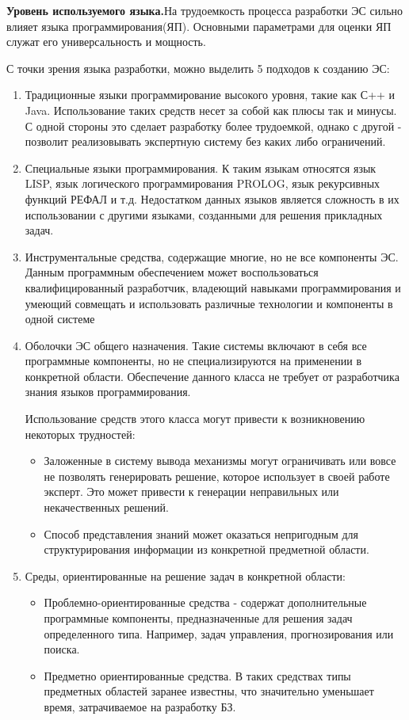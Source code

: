 \textbf{Уровень используемого языка.}На трудоемкость процесса разработки ЭС сильно влияет языка программирования(ЯП). Основными параметрами для оценки ЯП служат его универсальность и мощность.

С точки зрения языка разработки, можно выделить 5 подходов к созданию ЭС:

\begin{enumerate}
	\item Традиционные языки программирование высокого уровня, такие как С++ и Java. Использование таких средств несет за собой как плюсы так и минусы. С одной стороны это сделает разработку более трудоемкой, однако с другой - позволит реализовывать экспертную систему без каких либо ограничений.

	\item Специальные языки программирования. К таким языкам относятся язык LISP, язык логического программирования PROLOG, язык рекурсивных функций РЕФАЛ и т.д. Недостатком данных языков является сложность в их использовании с другими языками, созданными для решения прикладных задач.

	\item Инструментальные средства, содержащие многие, но не все компоненты ЭС. Данным программным обеспечением может воспользоваться квалифицированный разработчик, владеющий навыками программирования и умеющий совмещать и использовать различные технологии и компоненты в одной системе

	\item Оболочки ЭС общего назначения. Такие системы включают в себя все программные компоненты, но не специализируются на применении в конкретной области. Обеспечение данного класса не требует от разработчика знания языков программирования.

	Использование средств этого класса могут привести к возникновению некоторых трудностей:

	\begin{itemize}
		\item Заложенные в систему вывода механизмы могут ограничивать или вовсе не позволять генерировать решение, которое использует в своей работе эксперт. Это может привести к генерации неправильных или некачественных решений. 
		\item Способ представления знаний может оказаться непригодным для структурирования информации из конкретной предметной области.
		\end{itemize}

		\item Среды, ориентированные на решение задач в конкретной области:
		\begin{itemize}
		\item Проблемно-ориентированные средства - содержат дополнительные программные компоненты, предназначенные для решения задач определенного типа. Например, задач управления, прогнозирования или поиска.
		\item Предметно ориентированные средства. В таких средствах типы предметных областей заранее известны, что значительно уменьшает время, затрачиваемое на разработку БЗ.
	\end{itemize}

\end{enumerate}

